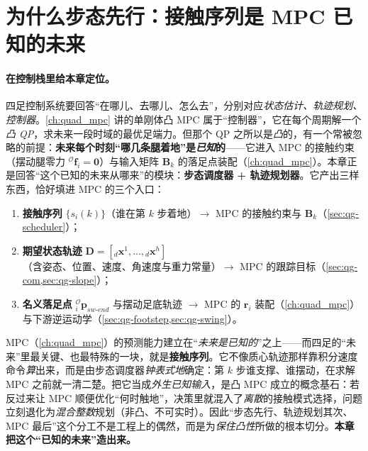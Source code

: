 \section{为什么步态先行：接触序列是 MPC 已知的未来}
\label{sec:qg-motivation}

\paragraph{在控制栈里给本章定位。}
四足控制系统要回答“在哪儿、去哪儿、怎么去”，分别对应\emph{状态估计、轨迹规划、控制器}。\cref{ch:quad_mpc} 讲的单刚体凸 MPC 属于“控制器”，它在每个周期解一个\emph{凸 QP}，求未来一段时域的最优足端力。但那个 QP 之所以是\emph{凸}的，有一个常被忽略的前提：\textbf{未来每个时刻“哪几条腿着地”是\emph{已知}的}——它进入 MPC 的接触约束（摆动腿零力 ${}^{\mathcal{O}}\boldsymbol{f}_i=\mathbf{0}$）与输入矩阵 $\mathbf{B}_k$ 的落足点装配（\cref{ch:quad_mpc}）。本章正是回答“这个已知的未来从哪来”的模块：\textbf{步态调度器 + 轨迹规划器}。它产出三样东西，恰好填进 MPC 的三个入口：
\begin{enumerate}
  \item \textbf{接触序列} $\{s_i(k)\}$（谁在第 $k$ 步着地）$\to$ MPC 的接触约束与 $\mathbf{B}_k$（\cref{sec:qg-scheduler}）；
  \item \textbf{期望状态轨迹} $\mathbf{D}=[{}_d\boldsymbol{x}^1,\dots,{}_d\boldsymbol{x}^h]$（含姿态、位置、速度、角速度与重力常量）$\to$ MPC 的跟踪目标（\cref{sec:qg-com,sec:qg-slope}）；
  \item \textbf{名义落足点} ${}_i^{\mathcal{O}}\boldsymbol{p}_{sw\text{-}end}$ 与摆动足底轨迹 $\to$ MPC 的 $\boldsymbol{r}_i$ 装配（\cref{ch:quad_mpc}）与下游逆运动学（\cref{sec:qg-footstep,sec:qg-swing}）。
\end{enumerate}

\begin{insight}\label{ins:qg-known-future}
MPC（\cref{ch:quad_mpc}）的预测能力建立在“\emph{未来是已知的}”之上——而四足的“未来”里最关键、也最特殊的一块，就是\textbf{接触序列}。它不像质心轨迹那样靠积分速度命令\emph{算}出来，而是由步态调度器\emph{钟表式地}确定：第 $k$ 步谁支撑、谁摆动，在求解 MPC 之前就一清二楚。把它当成\emph{外生已知输入}，是凸 MPC 成立的概念基石：若反过来让 MPC 顺便优化“何时触地”，决策里就混入了\emph{离散}的接触模式选择，问题立刻退化为\emph{混合整数}规划（非凸、不可实时）。因此“步态先行、轨迹规划其次、MPC 最后”这个分工不是工程上的偶然，而是为\emph{保住凸性}所做的根本切分。\textbf{本章把这个“已知的未来”造出来。}
\end{insight}

